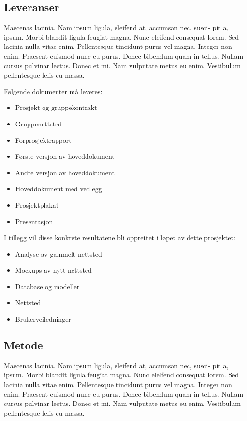\documentclass[11pt,a4paper]{report}
\begin{document}
\subsection*{Leveranser}

Maecenas lacinia. Nam ipsum ligula, eleifend at, accumsan nec, susci- pit a, ipsum. Morbi blandit ligula feugiat magna. Nunc eleifend consequat lorem. Sed lacinia nulla vitae enim. Pellentesque tincidunt purus vel magna. Integer non enim. Praesent euismod nunc eu purus. Donec bibendum quam in tellus. Nullam cursus pulvinar lectus. Donec et mi. Nam vulputate metus eu enim. Vestibulum pellentesque felis eu massa.

Følgende dokumenter må leveres:
\begin{itemize}
\item Prosjekt og gruppekontrakt
\item Gruppenettsted
\item Forprosjektrapport
\item Første versjon av hoveddokument
\item Andre versjon av hoveddokument
\item Hoveddokument med vedlegg
\item Prosjektplakat
\item Presentasjon
\end{itemize}

I tillegg vil disse konkrete resultatene bli opprettet i løpet av dette prosjektet:

\begin{itemize}
\item Analyse av gammelt nettsted
\item Mockups av nytt nettsted
\item Database og modeller
\item Nettsted
\item Brukerveiledninger
\end{itemize}



\subsection*{Metode}
Maecenas lacinia. Nam ipsum ligula, eleifend at, accumsan nec, susci- pit a, ipsum. Morbi blandit ligula feugiat magna. Nunc eleifend consequat lorem. Sed lacinia nulla vitae enim. Pellentesque tincidunt purus vel magna. Integer non enim. Praesent euismod nunc eu purus. Donec bibendum quam in tellus. Nullam cursus pulvinar lectus. Donec et mi. Nam vulputate metus eu enim. Vestibulum pellentesque felis eu massa.
\end{document}
